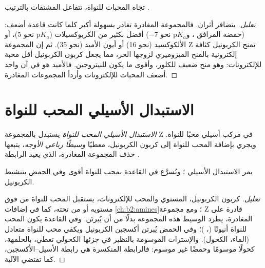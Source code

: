\begin{proposition}[سلّم التفاعلية]\label{prop:b2:acyl-substitution:reactivity}
تجاه المحبات للنواة، تتفاعل المشتقات بالترتيب .
\end{proposition}

\begin{proof}[تعليل]
يتضافر أثران. فالمجموعة المغادرة  تغادر بسهولة أكبر كلما كانت قاعدة أضعف:
 (حمضه المرافق ، و$\mathrm pK_a$ نحو $-7$) أفضل بكثير من الكربوكسيلات
($\mathrm pK_a$ نحو 5)، أو الألكوكسيد (نحو 16) أو أيون الأميد (نحو 35). ثم إن المجموعة Z تمنح
الكربونيل كثافة إلكترونية بالمنح الميزوميري لزوجها الحر، مما يجعل كربون الكربونيل
أقل محبة للإلكترونات: وهو منح ضعيف للكلور، وأقوى ما يكون للنيتروجين. فالأميد هو في آن واحد أضعف
المحبات للإلكترونات وأردأ المجموعات المغادرة.
\end{proof}

\section{الاستبدال الأسيلي المحب للنواة}

\begin{definition}\label{def:b2:acyl-substitution:nas}
\emph{الاستبدال الأسيلي المحب للنواة} يستبدل بالمجموعة Z
في مركب أسيلي محبًا للنواة. ويجري بإضافة المحب للنواة إلى كربون الكربونيل،
معطيًا \emph{وسيطًا رباعي الأوجه}، يتبعها
حذف المجموعة المغادرة، الذي يعيد الرابطة .
\end{definition}

\begin{proposition}\label{prop:b2:acyl-substitution:addition-elimination}
يمر الاستبدال الأسيلي ؛ ويُسرَّع في القاعدة بمحب للنواة أقوى
وفي الحمض بتنشيط الكربونيل.
\end{proposition}

\begin{proof}[تعليل]
كربون الكربونيل، المستوي والمحب للإلكترونات، يستقبل المحب للنواة من فوق مستويه أو من
تحته، كما في إضافات \cref{ch:b2:amines}؛ ومع مجموعة Z قادرة على المغادرة، يطرد الوسيط
هذه المجموعة بدلًا من أن يُبرتَن. وفي القاعدة يكون المحب للنواة أنيونًا (،
)؛ وفي الحمض يُبرتن أكسجين الكربونيل ويكفي محب للنواة متعادل (الماء، الكحول).
والإسترات الموسومة بالنظير  في جزئها الكحولي تعطي، بالحلمهة، كحولًا موسومًا
وحمضًا غير موسوم: فالرابطة المنكسرة هي رابطة الأسيل--الأكسجين، كما تقتضي الآلية.
\end{proof}

